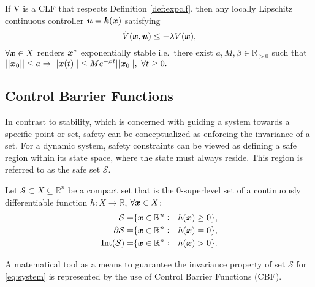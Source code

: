 \begin{theorem}\label{th:clftexp}
If V is a CLF that respects Definition \ref{def:expclf}, then any locally Lipschitz continuous controller $\boldsymbol{u}=\boldsymbol{k}(\boldsymbol{x})$ satisfying 
\begin{equation}
\dot{V}(\boldsymbol{x},\boldsymbol{u}) \leq -\lambda V(\boldsymbol{x}),
\end{equation}
$\forall \boldsymbol{x} \in X$ renders $\boldsymbol{x}^*$ exponentially stable i.e.~there exist $a,M,\beta \in \mathbb{R}_{>0}$ such that 
$|| \boldsymbol{x}_0 || \leq a \Rightarrow || \boldsymbol{x}(t) || \leq Me^{-\beta t}|| \boldsymbol{x}_0 ||,~\forall t\geq 0.$
\end{theorem}

\subsection{Control Barrier Functions}

In contrast to stability, which is concerned with guiding a system towards a specific point or set, safety can be conceptualized as enforcing the invariance of a set. For a dynamic system, safety constraints can be viewed as defining a safe region within its state space, where the state must always reside. This region is referred to as the safe set $\mathcal{S}$. 

\begin{definition} Let $\mathcal{S}\subset X\subseteq \mathbb{R}^n$ be a compact set that is the $0$-superlevel set of a continuously  differentiable function $h:X\to\mathbb{R}$, $\forall \boldsymbol{x} \in X$:
    \begin{equation}
        \begin{aligned}
\mathcal{S} =& \{\boldsymbol{x}\in\mathbb{R}^n :& h(\boldsymbol{x})\geq 0\}, \\
\partial{\mathcal{S}} =& \{\boldsymbol{x}\in\mathbb{R}^n :& h(\boldsymbol{x})= 0\}, \\
\mathrm{Int}({\mathcal{S}}) =& \{\boldsymbol{x}\in\mathbb{R}^n :& h(\boldsymbol{x})> 0\}. \\
\end{aligned}
\end{equation}
\end{definition}
\noindent
A matematical tool as a means to guarantee the invariance property of set $\mathcal{S}$ for \eqref{eq:system} is represented by the use of Control Barrier Functions (CBF).

